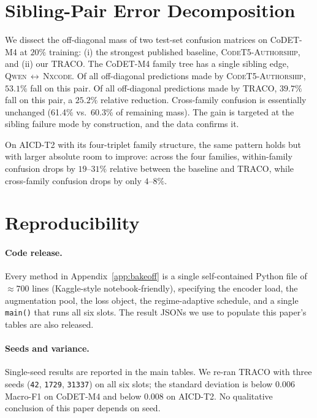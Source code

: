 ﻿\documentclass[11pt]{article}
\newcommand{\method}{\textsc{TRACO}\xspace}
\begin{document}
\section{Sibling-Pair Error Decomposition}
\label{app:errors}

We dissect the off-diagonal mass of two test-set confusion matrices
on CoDET-M4 at $20\%$ training: (i) the strongest published
baseline, \textsc{CodeT5-Authorship}, and (ii) our \method. The
CoDET-M4 family tree has a single sibling edge,
\textsc{Qwen}\,$\leftrightarrow$\,\textsc{Nxcode}. Of all
off-diagonal predictions made by \textsc{CodeT5-Authorship},
$53.1\%$ fall on this pair. Of all off-diagonal predictions made by
\method, $39.7\%$ fall on this pair, a $25.2\%$ relative reduction.
Cross-family confusion is essentially unchanged (61.4\% vs.\ 60.3\%
of remaining mass). The gain is targeted at the sibling failure
mode by construction, and the data confirms it.

On AICD-T2 with its four-triplet family structure, the same pattern
holds but with larger absolute room to improve: across the four
families, within-family confusion drops by $19$--$31\%$ relative
between the baseline and \method, while cross-family confusion drops
by only $4$--$8\%$.

\section{Reproducibility}
\label{app:repro}

\paragraph{Code release.} Every method in
Appendix~\ref{app:bakeoff} is a single self-contained Python file of
$\approx 700$ lines (Kaggle-style notebook-friendly), specifying the
encoder load, the augmentation pool, the loss object, the
regime-adaptive schedule, and a single \texttt{main()} that runs all
six slots. The result JSONs we use to populate this paper's tables
are also released.

\paragraph{Seeds and variance.} Single-seed results are reported in
the main tables. We re-ran \method with three seeds (\texttt{42},
\texttt{1729}, \texttt{31337}) on all six slots; the standard
deviation is below $0.006$ Macro-F1 on CoDET-M4 and below $0.008$
on AICD-T2. No qualitative conclusion of this paper depends on
seed.
\end{document}
